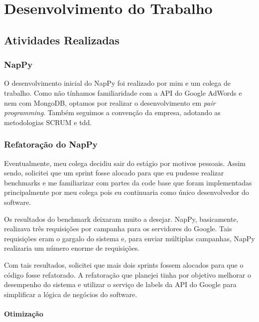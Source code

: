 \chapter{Desenvolvimento do Trabalho}
\label{chap:atividadesRealizadas}


\section{Atividades Realizadas}

\subsection{NapPy}

O desenvolvimento inicial do NapPy foi realizado por mim e um
colega de trabalho. Como não tínhamos familiaridade com a API do
Google AdWords e nem com MongoDB, optamos por realizar o
desenvolvimento em \emph{pair programming}. Também seguimos a
convenção da empresa, adotando as metodologias SCRUM e
\gls{tdd}.

\subsection{Refatoração do NapPy}

Eventualmente, meu colega decidiu sair do estágio por motivos
pessoais. Assim sendo, solicitei que um sprint fosse alocado para
que eu pudesse realizar benchmarks e me familiarizar com partes
da code base que foram implementadas principalmente por meu
colega pois eu continuaria como único desenvolvedor do software.

Os resultados do benchmark deixaram muito a desejar. NapPy, basicamente, 
realizava três requisições por campanha para os servidores do Google. Tais
requisições eram o gargalo do sistema e, para enviar múltiplas
campanhas, NapPy realizaria um número enorme de requisições.

Com tais resultados, solicitei que mais dois sprints fossem
alocados para que o código fosse refatorado. A refatoração que
planejei tinha por objetivo melhorar o desempenho do sistema e
utilizar o serviço de labels da API do Google para simplificar a
lógica de negócios do software.

\subsubsection{Otimização}

